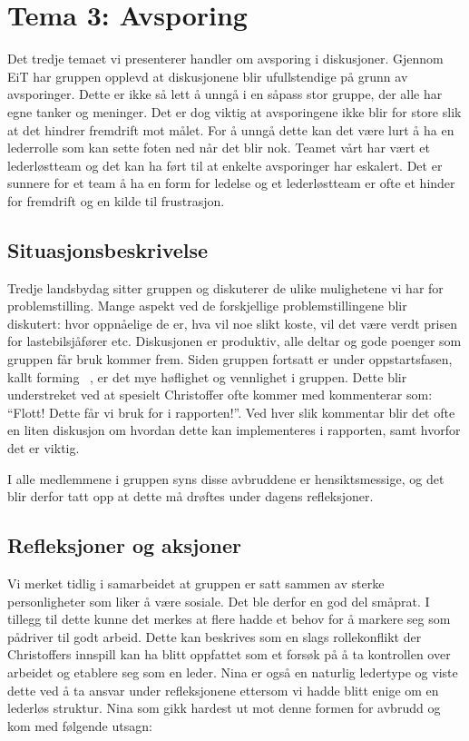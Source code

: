 \chapter{Tema 3: Avsporing}

Det tredje temaet vi presenterer handler om avsporing i diskusjoner. Gjennom EiT har gruppen opplevd at diskusjonene
blir ufullstendige på grunn av avsporinger. Dette er ikke så lett å unngå i en såpass stor gruppe, der alle har egne tanker og meninger.
Det er dog viktig at avsporingene ikke blir for store slik at det hindrer fremdrift mot målet. For å unngå dette kan det være lurt
å ha en lederrolle som kan sette foten ned når det blir nok. Teamet vårt har vært et lederløstteam og det kan ha ført til at 
enkelte avsporinger har eskalert. Det er sunnere for et team å ha en form for ledelse og et lederløstteam er ofte et hinder for 
fremdrift og en kilde til frustrasjon. \cite{Artikkel4}

\section{Situasjonsbeskrivelse}
Tredje landsbydag sitter gruppen og diskuterer de ulike mulighetene vi har for problemstilling. Mange aspekt ved de forskjellige problemstillingene blir diskutert: hvor oppnåelige de er, hva vil noe slikt koste, vil det være verdt prisen for lastebilsjåfører etc. Diskusjonen er produktiv, alle deltar og gode poenger som gruppen får bruk kommer frem. Siden gruppen fortsatt er under oppstartsfasen, kallt forming \cite{forming}\ , er det mye høflighet og vennlighet i gruppen. Dette blir understreket ved at spesielt Christoffer ofte kommer med kommenterar som: ``Flott! Dette får vi bruk for i rapporten!''. Ved hver slik kommentar blir det ofte en liten diskusjon om hvordan dette kan implementeres i rapporten, samt hvorfor det er viktig.

I alle medlemmene i gruppen syns disse avbruddene er hensiktsmessige, og det blir derfor tatt opp at dette må drøftes under dagens refleksjoner.

\section{Refleksjoner og aksjoner}

Vi merket tidlig i samarbeidet at gruppen er satt sammen av sterke personligheter som liker å være sosiale. Det ble derfor en god del småprat. I 
tillegg til dette kunne det merkes at flere hadde et behov for å markere seg som pådriver til godt arbeid. Dette kan beskrives som en slags 
rollekonflikt \cite{Artikkel2} der Christoffers innspill kan ha blitt oppfattet som et forsøk på å ta kontrollen over arbeidet og etablere seg som en 
leder. Nina er også en naturlig ledertype og viste dette ved å ta ansvar under refleksjonene ettersom vi hadde blitt enige om en lederløs 
struktur. Nina som gikk hardest ut mot denne formen for avbrudd og kom med følgende utsagn: 

